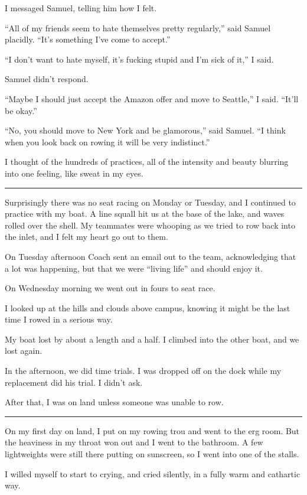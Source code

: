 I messaged Samuel, telling him how I felt.

``All of my friends seem to hate themselves pretty regularly,'' said Samuel
placidly.  ``It's something I've come to accept.''

``I don't want to hate myself, it's fucking stupid and I'm sick of it,'' I said.  

Samuel didn't respond.

``Maybe I should just accept the Amazon offer and move to Seattle,'' I said.
``It'll be okay.''

``No, you should move to New York and be glamorous,'' said Samuel.  ``I think
when you look back on rowing it will be very indistinct.'' 

I thought of the hundreds of practices, all of the intensity and beauty blurring
into one feeling, like sweat in my eyes.

\plainfancybreak{12pt}{2}{}

Surprisingly there was no seat racing on Monday or Tuesday, and I continued to
practice with my boat.  A line squall hit us at the base of the lake, and waves
rolled over the shell.  My teammates were whooping as we tried to row back into
the inlet, and I felt my heart go out to them.

On Tuesday afternoon Coach sent an email out to the team, acknowledging that a
lot was happening, but that we were ``living life'' and should enjoy it.

On Wednesday morning we went out in fours to seat race.

I looked up at the hills and clouds above campus, knowing it might be the last
time I rowed in a serious way.  

My boat lost by about a length and a half.  I climbed into the other boat, and
we lost again.

In the afternoon, we did time trials.  I was dropped off on the dock while my
replacement did his trial.  I didn't ask.

After that, I was on land unless someone was unable to row.
 
\plainfancybreak{12pt}{2}{}

On my first day on land, I put on my rowing trou and went to the erg room.  But
the heaviness in my throat won out and I went to the bathroom.  A few
lightweights were still there putting on sunscreen, so I went into one of the
stalls.  

I willed myself to start to crying, and cried silently, in a fully warm and
cathartic way.  

